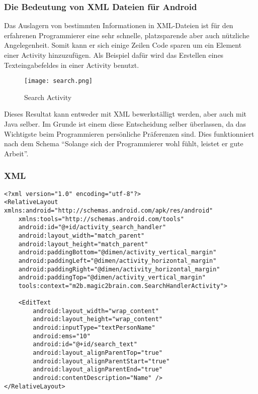 \subsubsection{Die Bedeutung von XML Dateien für Android}

Das Auslagern von bestimmten Informationen in XML-Dateien ist für den erfahrenen Programmierer eine sehr schnelle, platzsparende aber auch nützliche Angelegenheit.
Somit kann er sich einige Zeilen Code sparen um ein Element einer Activity hinzuzufügen. Als Beispiel dafür wird das Erstellen eines Texteingabefeldes in einer Activity benutzt.

\begin{figure}[htbp] 
  \centering
     \texttt{[image: search.png]}
  \caption{Search Activity \cite{search_app}}
  \label{fig:SearchActivity}
\end{figure}

Dieses Resultat kann entweder mit XML bewerkställigt werden, aber auch mit Java selber. Im Grunde ist einem diese Entscheidung selber überlassen, da das Wichtigste beim Programmieren persönliche Präferenzen sind. Dies funktionniert nach dem Schema "`Solange sich der Programmierer wohl fühlt, leistet er gute Arbeit"'.\\

\subsubsection*{XML}
\begin{lstlisting}
<?xml version="1.0" encoding="utf-8"?>
<RelativeLayout xmlns:android="http://schemas.android.com/apk/res/android"
    xmlns:tools="http://schemas.android.com/tools"
    android:id="@+id/activity_search_handler"
    android:layout_width="match_parent"
    android:layout_height="match_parent"
    android:paddingBottom="@dimen/activity_vertical_margin"
    android:paddingLeft="@dimen/activity_horizontal_margin"
    android:paddingRight="@dimen/activity_horizontal_margin"
    android:paddingTop="@dimen/activity_vertical_margin"
    tools:context="m2b.magic2brain.com.SearchHandlerActivity">

    <EditText
        android:layout_width="wrap_content"
        android:layout_height="wrap_content"
        android:inputType="textPersonName"
        android:ems="10"
        android:id="@+id/search_text"
        android:layout_alignParentTop="true"
        android:layout_alignParentStart="true"
        android:layout_alignParentEnd="true"
        android:contentDescription="Name" />
</RelativeLayout>
\end{lstlisting}

